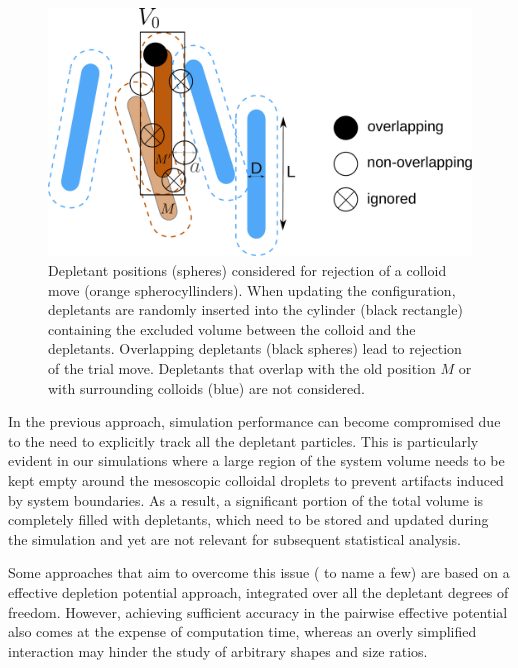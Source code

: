 \begin{figure}
\begin{center}
\includegraphics[width= .8\columnwidth]{figures/chapter-1/implicit_depletants}
\caption[Depletant positions (spheres) considered for rejection of a colloid move (orange spherocyllinders)]{ \label{implicit} Depletant positions (spheres) considered for rejection of a colloid move (orange spherocyllinders). When updating the configuration, depletants are randomly inserted into the cylinder (black rectangle) containing the excluded volume between the colloid and the depletants. Overlapping depletants (black spheres) lead to rejection of the trial move. Depletants that overlap with the old position $M$ or with surrounding colloids (blue) are not considered.}
\end{center}
\end{figure}

In the previous approach, simulation performance can become compromised due to the need to explicitly track all the depletant particles. This is particularly evident in our simulations where a large region of the system volume needs to be kept empty around the mesoscopic colloidal droplets to prevent artifacts induced by system boundaries. As a result, a significant portion of the total volume is completely filled with depletants, which need to be stored and updated during the simulation and yet are not relevant for subsequent statistical analysis.

Some approaches that aim to overcome this issue (\cite{bolhuis_jcp1997,PhysRevE.73.041404,Henzie2011} to name a few) are based on a effective depletion potential approach, integrated over all the depletant degrees of freedom. However, achieving sufficient accuracy in the pairwise effective potential also comes at the expense of computation time, whereas an overly simplified interaction may hinder the study of arbitrary shapes and size ratios.


